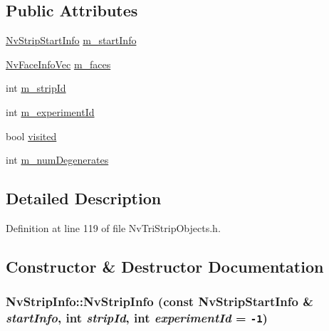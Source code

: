 \subsection*{Public Attributes}
\begin{CompactItemize}
\item 
\hyperlink{class_nv_strip_start_info}{NvStripStartInfo} \hyperlink{class_nv_strip_info_010bfd6d2e52445176a7cbfb79a53d05}{m\_\-startInfo}
\item 
\hyperlink{_nv_tri_strip_objects_8h_93d0a2f26991e801145908bc4d3d9156}{NvFaceInfoVec} \hyperlink{class_nv_strip_info_5920a296e1f7f1146893ee6672d76aee}{m\_\-faces}
\item 
int \hyperlink{class_nv_strip_info_d22113688db1e746fb0956473ceca96f}{m\_\-stripId}
\item 
int \hyperlink{class_nv_strip_info_c206788f90d9e14394972cd7ea989c1d}{m\_\-experimentId}
\item 
bool \hyperlink{class_nv_strip_info_670cb128ad83879668b1a8e90ed2462c}{visited}
\item 
int \hyperlink{class_nv_strip_info_91a71056da89624852630282c30b3b10}{m\_\-numDegenerates}
\end{CompactItemize}


\subsection{Detailed Description}


Definition at line 119 of file NvTriStripObjects.h.

\subsection{Constructor \& Destructor Documentation}
\hypertarget{class_nv_strip_info_bff0ec4c94a3d7a54d6c2f6a9752f979}{
\subsubsection[{NvStripInfo}]{\setlength{\rightskip}{0pt plus 5cm}NvStripInfo::NvStripInfo (const {\bf NvStripStartInfo} \& {\em startInfo}, \/  int {\em stripId}, \/  int {\em experimentId} = {\tt -1})}}
\label{class_nv_strip_info_bff0ec4c94a3d7a54d6c2f6a9752f979}




